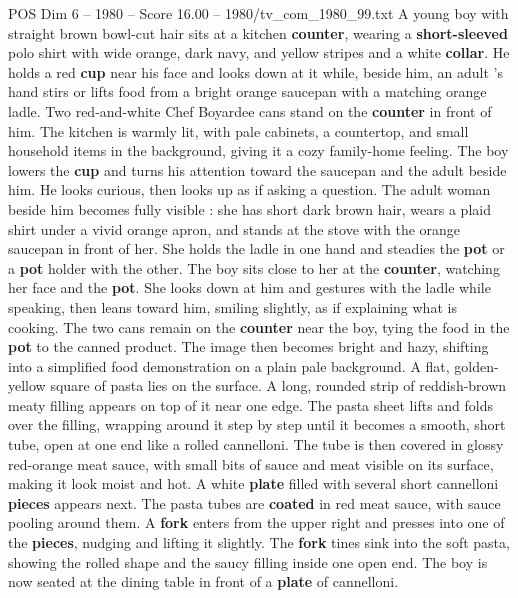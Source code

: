 \begin{textsample}{POS Dim 6 – 1980 – Score 16.00 – 1980/tv\_com\_1980\_99.txt}  \label{ex:f6_pos_031}
A young boy with straight brown bowl-cut hair sits at a kitchen \textbf{counter}, wearing a \textbf{short-sleeved} polo shirt with wide orange, dark navy, and yellow stripes and a white \textbf{collar}.
He holds a red \textbf{cup} near his face and looks down at it while, beside him, an adult ’s hand stirs or lifts food from a bright orange saucepan with a matching orange ladle.
Two red-and-white Chef Boyardee cans stand on the \textbf{counter} in front of him.
The kitchen is warmly lit, with pale cabinets, a countertop, and small household items in the background, giving it a cozy family-home feeling.
The boy lowers the \textbf{cup} and turns his attention toward the saucepan and the adult beside him.
He looks curious, then looks up as if asking a question.
The adult woman beside him becomes fully visible : she has short dark brown hair, wears a plaid shirt under a vivid orange apron, and stands at the stove with the orange saucepan in front of her.
She holds the ladle in one hand and steadies the \textbf{pot} or a \textbf{pot} holder with the other.
The boy sits close to her at the \textbf{counter}, watching her face and the \textbf{pot}.
She looks down at him and gestures with the ladle while speaking, then leans toward him, smiling slightly, as if explaining what is cooking.
The two cans remain on the \textbf{counter} near the boy, tying the food in the \textbf{pot} to the canned product.
The image then becomes bright and hazy, shifting into a simplified food demonstration on a plain pale background.
A flat, golden-yellow square of pasta lies on the surface.
A long, rounded strip of reddish-brown meaty filling appears on top of it near one edge.
The pasta sheet lifts and folds over the filling, wrapping around it step by step until it becomes a smooth, short tube, open at one end like a rolled cannelloni.
The tube is then covered in glossy red-orange meat sauce, with small bits of sauce and meat visible on its surface, making it look moist and hot.
A white \textbf{plate} filled with several short cannelloni \textbf{pieces} appears next.
The pasta tubes are \textbf{coated} in red meat sauce, with sauce pooling around them.
A \textbf{fork} enters from the upper right and presses into one of the \textbf{pieces}, nudging and lifting it slightly.
The \textbf{fork} tines sink into the soft pasta, showing the rolled shape and the saucy filling inside one open end.
The boy is now seated at the dining table in front of a \textbf{plate} of cannelloni.

\end{textsample}
